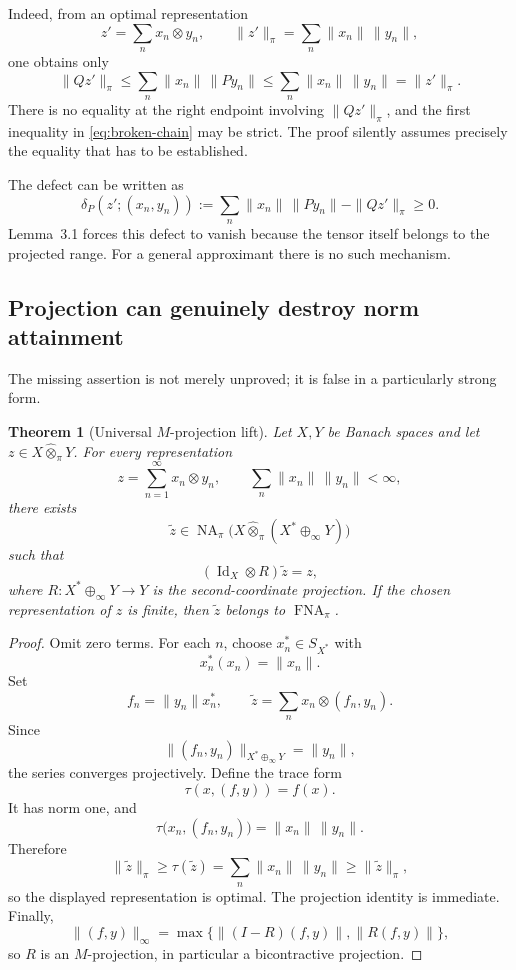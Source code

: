 \documentclass[11pt]{article}
\newtheorem{theorem}{Theorem}[section]
\theoremstyle{definition}
\theoremstyle{remark}
\newcommand{\whot}{\widehat\otimes_\pi}
\newcommand{\NA}{\operatorname{NA}_\pi}
\newcommand{\FNA}{\operatorname{FNA}_\pi}
\newcommand{\Id}{\operatorname{Id}}
\begin{document}
Indeed, from an optimal representation
\[
 z'=\sum_nx_n\otimes y_n,
 \qquad
 \|z'\|_\pi=\sum_n\|x_n\|\,\|y_n\|,
\]
one obtains only
\begin{equation}\label{eq:broken-chain}
 \|Qz'\|_\pi
 \leq\sum_n\|x_n\|\,\|Py_n\|
 \leq\sum_n\|x_n\|\,\|y_n\|
 =\|z'\|_\pi.
\end{equation}
There is no equality at the right endpoint involving $\|Qz'\|_\pi$, and the first inequality in \eqref{eq:broken-chain} may be strict.  The proof silently assumes precisely the equality that has to be established.

The defect can be written as
\[
 \delta_P(z';(x_n,y_n))
 :=\sum_n\|x_n\|\,\|Py_n\|-\|Qz'\|_\pi\geq0.
\]
Lemma~3.1 forces this defect to vanish because the tensor itself belongs to the projected range.  For a general approximant there is no such mechanism.

\subsection{Projection can genuinely destroy norm attainment}

The missing assertion is not merely unproved; it is false in a particularly strong form.

\begin{theorem}[Universal $M$-projection lift]\label{thm:M-lift}
Let $X,Y$ be Banach spaces and let $z\in X\whot Y$.  For every representation
\[
 z=\sum_{n=1}^\infty x_n\otimes y_n,
 \qquad
 \sum_n\|x_n\|\,\|y_n\|<\infty,
\]
there exists
\[
 \widetilde z\in\NA\bigl(X\whot(X^*\oplus_\infty Y)\bigr)
\]
such that
\[
 (\Id_X\otimes R)\widetilde z=z,
\]
where $R:X^*\oplus_\infty Y\to Y$ is the second-coordinate projection.  If the chosen representation of $z$ is finite, then $\widetilde z$ belongs to $\FNA$.
\end{theorem}

\begin{proof}
Omit zero terms.  For each $n$, choose $x_n^*\in S_{X^*}$ with
\[
 x_n^*(x_n)=\|x_n\|.
\]
Set
\[
 f_n=\|y_n\|x_n^*,
 \qquad
 \widetilde z=\sum_nx_n\otimes(f_n,y_n).
\]
Since
\[
 \|(f_n,y_n)\|_{X^*\oplus_\infty Y}=\|y_n\|,
\]
the series converges projectively.  Define the trace form
\[
 \tau(x,(f,y))=f(x).
\]
It has norm one, and
\[
 \tau\bigl(x_n,(f_n,y_n)\bigr)
 =\|x_n\|\,\|y_n\|.
\]
Therefore
\[
 \|\widetilde z\|_\pi
 \geq \tau(\widetilde z)
 =\sum_n\|x_n\|\,\|y_n\|
 \geq\|\widetilde z\|_\pi,
\]
so the displayed representation is optimal.  The projection identity is immediate.  Finally,
\[
 \|(f,y)\|_\infty
 =\max\{\|(I-R)(f,y)\|,\|R(f,y)\|\},
\]
so $R$ is an $M$-projection, in particular a bicontractive projection.
\end{proof}
\end{document}
